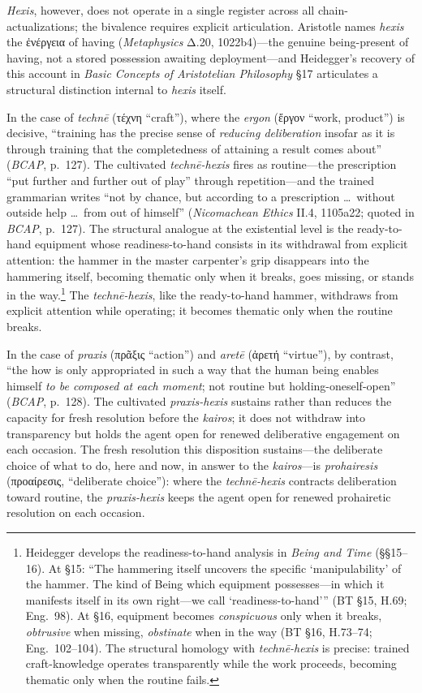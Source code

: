 \documentclass{article}
\newcommand{\gk}[1]{{\greekfont #1}}
\begin{document}
\textit{Hexis}, however, does not operate in a single register across all chain-actualizations; the bivalence requires explicit articulation. Aristotle names \textit{hexis} the \gk{ἐνέργεια} of having (\textit{Metaphysics} Δ.20, 1022b4)---the genuine being-present of having, not a stored possession awaiting deployment---and Heidegger's recovery of this account in \textit{Basic Concepts of Aristotelian Philosophy} \S17 articulates a structural distinction internal to \textit{hexis} itself.

In the case of \textit{technē} (\gk{τέχνη} ``craft''), where the \textit{ergon} (\gk{ἔργον} ``work, product'') is decisive, ``training has the precise sense of \textit{reducing deliberation} insofar as it is through training that the completedness of attaining a result comes about'' (\textit{BCAP}, p.~127). The cultivated \textit{technē-hexis} fires as routine---the prescription ``put further and further out of play'' through repetition---and the trained grammarian writes ``not by chance, but according to a prescription \ldots\ without outside help \ldots\ from out of himself'' (\textit{Nicomachean Ethics} II.4, 1105a22; quoted in \textit{BCAP}, p.~127). The structural analogue at the existential level is the ready-to-hand equipment whose readiness-to-hand consists in its withdrawal from explicit attention: the hammer in the master carpenter's grip disappears into the hammering itself, becoming thematic only when it breaks, goes missing, or stands in the way.\footnote{Heidegger develops the readiness-to-hand analysis in \textit{Being and Time} (\S\S15--16). At \S15: ``The hammering itself uncovers the specific `manipulability' of the hammer. The kind of Being which equipment possesses---in which it manifests itself in its own right---we call `readiness-to-hand''' (BT \S15, H.69; Eng.~98). At \S16, equipment becomes \textit{conspicuous} only when it breaks, \textit{obtrusive} when missing, \textit{obstinate} when in the way (BT \S16, H.73--74; Eng.~102--104). The structural homology with \textit{technē-hexis} is precise: trained craft-knowledge operates transparently while the work proceeds, becoming thematic only when the routine fails.} The \textit{technē-hexis}, like the ready-to-hand hammer, withdraws from explicit attention while operating; it becomes thematic only when the routine breaks.

In the case of \textit{praxis} (\gk{πρᾶξις} ``action'') and \textit{aretē} (\gk{ἀρετή} ``virtue''), by contrast, ``the how is only appropriated in such a way that the human being enables himself \textit{to be composed at each moment}; not routine but holding-oneself-open'' (\textit{BCAP}, p.~128). The cultivated \textit{praxis-hexis} sustains rather than reduces the capacity for fresh resolution before the \textit{kairos}; it does not withdraw into transparency but holds the agent open for renewed deliberative engagement on each occasion. The fresh resolution this disposition sustains---the deliberate choice of what to do, here and now, in answer to the \textit{kairos}---is \textit{prohairesis} (\gk{προαίρεσις}, ``deliberate choice''): where the \textit{technē-hexis} contracts deliberation toward routine, the \textit{praxis-hexis} keeps the agent open for renewed prohairetic resolution on each occasion.
\end{document}
